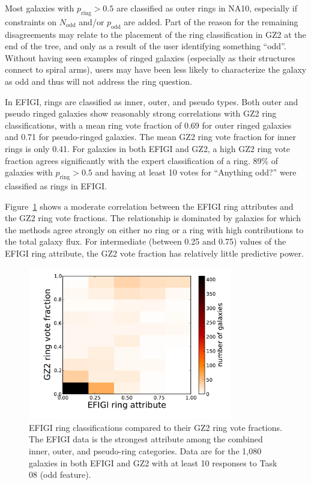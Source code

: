 \documentclass[useAMS,usenatbib]{mn2e}
\begin{document}
Most galaxies with $p_\mathrm{ring}>0.5$ are classified as outer rings in NA10, especially if constraints on $N_\mathrm{odd}$ and/or $p_\mathrm{odd}$ are added. Part of the reason for the remaining disagreements may relate to the placement of the ring classification in GZ2 at the end of the tree, and only as a result of the user identifying something ``odd''. Without having seen examples of ringed galaxies (especially as their structures connect to spiral arms), users may have been less likely to characterize the galaxy as odd and thus will not address the ring question. 

In EFIGI, rings are classified as inner, outer, and pseudo types. Both outer and pseudo ringed galaxies show reasonably strong correlations with GZ2 ring classifications, with a mean ring vote fraction of 0.69 for outer ringed galaxies and 0.71 for pseudo-ringed galaxies. The mean GZ2 ring vote fraction for inner rings is only 0.41. For galaxies in both EFIGI and GZ2, a high GZ2 ring vote fraction agrees significantly with the expert classification of a ring. 89\% of galaxies with $p_\mathrm{ring}>0.5$ and having at least 10 votes for ``Anything odd?'' were classified as rings in EFIGI. 

Figure~\ref{fig-efigi_rings} shows a moderate correlation between the EFIGI ring attributes and the GZ2 ring vote fractions. The relationship is dominated by galaxies for which the methods agree strongly on either no ring or a ring with high contributions to the total galaxy flux. For intermediate (between 0.25 and 0.75) values of the EFIGI ring attribute, the GZ2 vote fraction has relatively little predictive power. %

\begin{figure}
\includegraphics[angle=0,width=3.5in]{figures/efigi_rings.pdf}
\caption{EFIGI ring classifications compared to their GZ2 ring vote fractions. The EFIGI data is the strongest attribute among the combined inner, outer, and pseudo-ring categories. Data are for the 1,080 galaxies in both EFIGI and GZ2 with at least 10 responses to Task 08 (odd feature). 
\label{fig-efigi_rings}}
\end{figure}
\end{document}
